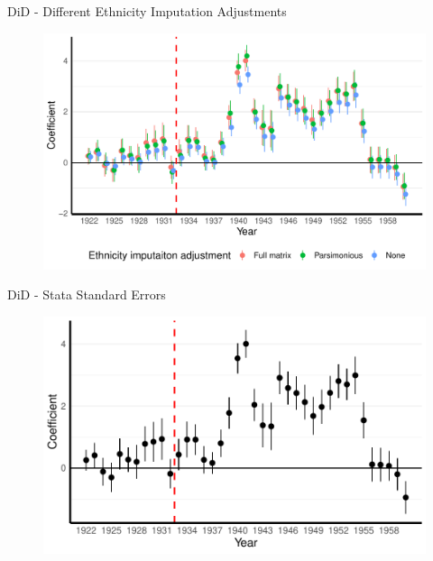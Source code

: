 \documentclass[11pt]{beamer}
\begin{document}
\begin{frame}[label=did_time_trends]{DiD - Different Ethnicity Imputation Adjustments}
 \begin{figure}[h]
\centering
\includegraphics[width=1\textwidth]{pred_adj_comp_pred_full_imp_date_cr2.pdf}
\end{figure}
\hyperlink{robustness_checks}{}
\end{frame}


\begin{frame}[label=did_stata_se]{DiD - Stata Standard Errors}
 \begin{figure}[h]
\centering
\includegraphics[width=1\textwidth]{fmla_pred_full_imp_date_no_trends_geopol_stata_SE.pdf}
\end{figure}
\hyperlink{robustness_checks}{}
\end{frame}
\end{document}
